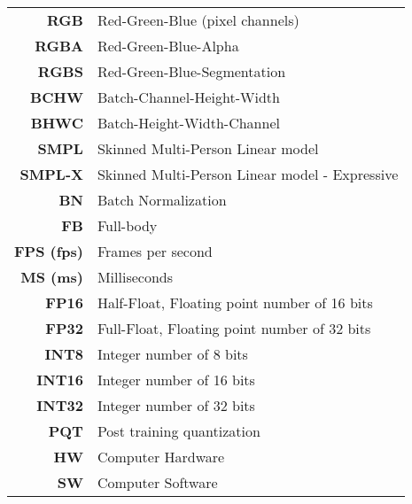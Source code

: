 \begin{table}[!ht]
\begin{tabular}{>{\bf}r l}
		RGB & Red-Green-Blue (pixel channels) \\
		RGBA & Red-Green-Blue-Alpha \\
		RGBS & Red-Green-Blue-Segmentation \\
		BCHW & Batch-Channel-Height-Width \\
		BHWC & Batch-Height-Width-Channel \\
		SMPL & Skinned Multi-Person Linear model \cite{dnn:smpl15} \\
		SMPL-X & Skinned Multi-Person Linear model - Expressive \cite{dnn:smplx19}\\
		BN & Batch Normalization \\
		FB & Full-body \\
		FPS (fps) & Frames per second\\
		MS (ms) & Milliseconds \\
		FP16 & Half-Float, Floating point number of 16 bits \\
		FP32 & Full-Float, Floating point number of 32 bits \\
		INT8 & Integer number of 8 bits \\
		INT16 & Integer number of 16 bits \\
		INT32 & Integer number of 32 bits \\
		PQT & Post training quantization \\
		HW & Computer Hardware \\
		SW & Computer Software \\
	\end{tabular}
\end{table}